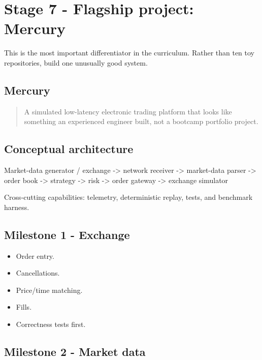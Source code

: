 \documentclass[11pt,letterpaper]{article}
\begin{document}
\section{Stage 7 - Flagship project: Mercury}\label{sec:11}

\label{stage:7}

This is the most important differentiator in the curriculum. Rather than ten toy repositories, build one unusually good system.

\subsection*{Mercury}

\begin{quote}
A simulated low-latency electronic trading platform that looks like something an experienced engineer built, not a bootcamp portfolio project.
\end{quote}

\subsection*{Conceptual architecture}

{\ttfamily\raggedright Market-data generator / exchange  ->  network receiver  ->  market-data parser  ->  order book  ->  strategy  ->  risk  ->  order gateway  ->  exchange simulator\par}

Cross-cutting capabilities: telemetry, deterministic replay, tests, and benchmark harness.

\subsection*{Milestone 1 - Exchange}

\begin{itemize}

\item Order entry.

\item Cancellations.

\item Price/time matching.

\item Fills.

\item Correctness tests first.

\end{itemize}

\subsection*{Milestone 2 - Market data}
\end{document}

